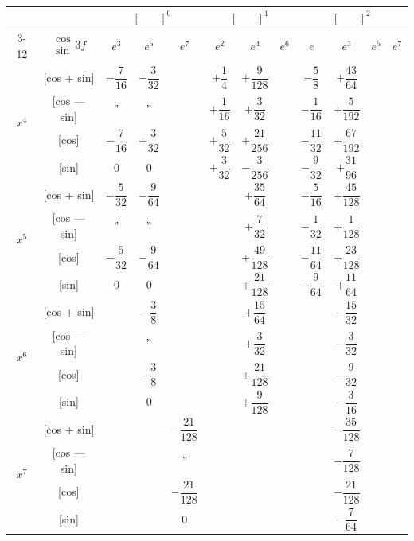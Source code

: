 \documentclass[11pt,a4paper]{book}
\begin{document}
{{\newpage


\begin{center}
\small
\begin{tabular}{|c|c|c|c|c|c|c|c|c|c|c|c|}
\hline
& & \multicolumn{3}{c|}{$[\phantom{()}]^0$} & \multicolumn{3}{c|}{$[\phantom{()}]^1$} & \multicolumn{4}{c|}{$[\phantom{()}]^2$} \\
\cline{3-12}
& $\begin{smallmatrix} \cos \\ \sin \end{smallmatrix} 3f$ & $e^3$ & $e^5$ & $e^7$ & $e^2$ & $e^4$ & $e^6$ & $e$ & $e^3$ & $e^5$ & $e^7$ \\
\hline
\multirow{4}{*}{$x^4$} & [cos + sin] & $-\dfrac{7}{16}$ & $+\dfrac{3}{32}$ & & $+\dfrac{1}{4}$ & $+\dfrac{9}{128}$ & & $-\dfrac{5}{8}$ & $+\dfrac{43}{64}$ \\
& [cos --- sin] & $"$ & $"$ & & $+\dfrac{1}{16}$ & $+\dfrac{3}{32}$ & & $-\dfrac{1}{16}$ & $+\dfrac{5}{192}$ \\
& [cos] & $-\dfrac{7}{16}$ & $+\dfrac{3}{32}$ & & $+\dfrac{5}{32}$ & $+\dfrac{21}{256}$ & & $-\dfrac{11}{32}$ & $+\dfrac{67}{192}$ \\
& [sin] & $0$ & $0$ & & $+\dfrac{3}{32}$ & $-\dfrac{3}{256}$ & & $-\dfrac{9}{32}$ & $+\dfrac{31}{96}$ \\
\hline
\multirow{4}{*}{$x^5$} & [cos + sin] & $-\dfrac{5}{32}$ & $-\dfrac{9}{64}$ & & & $+\dfrac{35}{64}$ & & $-\dfrac{5}{16}$ & $+\dfrac{45}{128}$ \\
& [cos --- sin] & $"$ & $"$ & & & $+\dfrac{7}{32}$ & & $-\dfrac{1}{32}$ & $+\dfrac{1}{128}$ \\
& [cos] & $-\dfrac{5}{32}$ & $-\dfrac{9}{64}$ & & & $+\dfrac{49}{128}$ & & $-\dfrac{11}{64}$ & $+\dfrac{23}{128}$ \\
& [sin] & $0$ & $0$ & & & $+\dfrac{21}{128}$ & & $-\dfrac{9}{64}$ & $+\dfrac{11}{64}$ \\
\hline
\multirow{4}{*}{$x^6$} & [cos + sin] & & $-\dfrac{3}{8}$ & & & $+\dfrac{15}{64}$ & & & $-\dfrac{15}{32}$ \\
& [cos --- sin] & & $"$ & & & $+\dfrac{3}{32}$ & & & $-\dfrac{3}{32}$ \\
& [cos] & & $-\dfrac{3}{8}$ & & & $+\dfrac{21}{128}$ & & & $-\dfrac{9}{32}$ \\
& [sin] & & $0$ & & & $+\dfrac{9}{128}$ & & & $-\dfrac{3}{16}$ \\
\hline
\multirow{4}{*}{$x^7$} & [cos + sin] & & & $-\dfrac{21}{128}$ & & & & & $-\dfrac{35}{128}$ \\
& [cos --- sin] & & & $"$ & & & & & $-\dfrac{7}{128}$ \\
& [cos] & & & $-\dfrac{21}{128}$ & & & & & $-\dfrac{21}{128}$ \\
& [sin] & & & $0$ & & & & & $-\dfrac{7}{64}$ \\
\hline
\end{tabular}
\end{center}

}}
\end{document}
